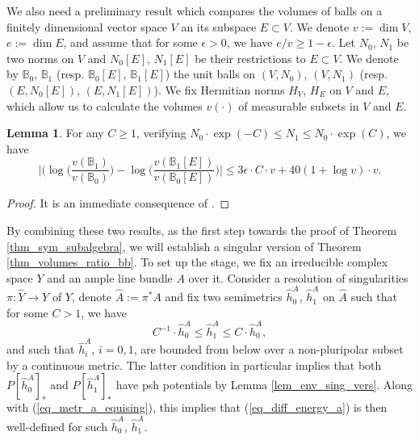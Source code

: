 \documentclass[12pt]{article}
\numberwithin{equation}{section}
\theoremstyle{theorem}
\theoremstyle{definition}
\newtheorem{lem}[thm]{Lemma}
\theoremstyle{remark}
\newcommand{\vol}{v}
\begin{document}
	\par 
	We also need a preliminary result which compares the volumes of balls on a finitely dimensional vector space $V$ an its subspace $E \subset V$.
	We denote $v := \dim V$, $e := \dim E$, and assume that for some $\epsilon > 0$, we have $e/v \geq 1 - \epsilon$.
	Let $N_0$, $N_1$ be two norms on $V$ and $N_0[E]$, $N_1[E]$ be their restrictions to $E \subset V$.
	We denote by $\mathbb{B}_0$, $\mathbb{B}_1$ (resp. $\mathbb{B}_0[E]$, $\mathbb{B}_1[E]$) the unit balls on $(V, N_0)$, $(V, N_1)$ (resp. $(E, N_0[E])$, $(E, N_1[E])$).
	We fix Hermitian norms $H_V$, $H_E$ on $V$ and $E$, which allow us to calculate the volumes $\vol(\cdot)$ of measurable subsets in $V$ and $E$. 
	\begin{lem}\label{lem_comp_rest}
		For any $C \geq 1$, verifying $N_0 \cdot \exp(-C) \leq N_1 \leq N_0 \cdot \exp(C)$, we have
		\begin{equation}\label{eq_comp_dist_two}
			\Big| \Big( \log \Big( \frac{\vol(\mathbb{B}_1)}{\vol(\mathbb{B}_0)} \Big) - \log \Big( \frac{\vol(\mathbb{B}_1[E])}{\vol(\mathbb{B}_0[E])} \Big) \Big|
			\leq
			3 \epsilon \cdot C \cdot v + 40 (1 + \log v) \cdot v.
		\end{equation}
	\end{lem}
	\begin{proof}
		It is an immediate consequence of \cite[Lemmas 2.22 and 3.3]{FinGQBig}.
	\end{proof}
	\par 
	By combining these two results, as the first step towards the proof of Theorem \ref{thm_sym_subalgebra}, we will establish a singular version of Theorem \ref{thm_volumes_ratio_bb}.
	To set up the stage, we fix an irreducible complex space $Y$ and an ample line bundle $A$ over it.
	Consider a resolution of singularities $\pi: \widehat{Y} \to Y$ of $Y$, denote $\widehat{A} := \pi^* A$ and fix two semimetrics $\widehat{h}^A_0$, $\widehat{h}^A_1$ on $\widehat{A}$ such that for some $C > 1$, we have 
	\begin{equation}\label{eq_metr_a_equising}
		C^{-1} \cdot \widehat{h}^A_0 \leq \widehat{h}^A_1 \leq C \cdot \widehat{h}^A_0,
	\end{equation}
	and such that $\widehat{h}^A_i$, $i = 0, 1$, are bounded from below over a non-pluripolar subset by a continuous metric.
	The latter condition in particular implies that both $P[\widehat{h}^A_0]_*$ and $P[\widehat{h}^A_1]_*$ have psh potentials by Lemma \ref{lem_env_sing_vers}.
	Along with (\ref{eq_metr_a_equising}), this implies that (\ref{eq_diff_energy_a}) is then well-defined for such $\widehat{h}^A_0$, $\widehat{h}^A_1$.
\end{document}
